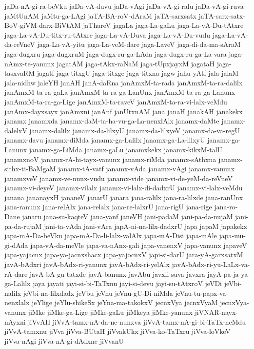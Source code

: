 {jaDa-nA-gi-ra-beVku
jaDa-vA-duvu
jaDa-vAgi
jaDa-vA-gi-ralu
jaDa-vA-gi-ruva
jaMtUnAM
jaMtu-ga-LAgi
jaTA-BA-roV-dAraM
jaTA-sarxsatx
jaTA-sarx-satx-BoV-giVM-darx-BiVtAM
jaThareV
jagaLa
jaga-La-gaLu
jaga-La-vA-Du-tAtxre
jaga-La-vA-Du-titx-ru-tAtxre
jaga-La-vA-Duva
jaga-La-vA-Du-vudu
jaga-La-vA-da-reVneV
jaga-La-vA-yitu
jaga-La-veM-dare
jaga-LaveV
jaga-di-da-ma-sAraM
jaga-dugxru
jaga-dugxruM
jaga-dugx-ru-ga-LAda
jaga-dugx-ru-ga-La-vara
jaga-nAmx-te-yanunx
jagatAM
jaga-tAkx-raNaM
jaga-tUpxjayxM
jagataH
jaga-tasxvaRM
jagatf
jaga-titxgU
jaga-titxge
jaga-titxna
jagw
jahu-yAtf
jala
jalaM
jala-nidhw
jaleYH
janAH
janA-daRna
janAmxM-ta-rada
janAmxM-ta-ra-dalilx
janAmxM-ta-ra-gaLa
janAmxM-ta-ra-ga-LanUnx
janAmxM-ta-ra-ga-Lanunx
janAmxM-ta-ra-ga-Lige
janAmxM-ta-raveV
janAmxM-ta-ra-vi-lalx-veMdu
janAmx-dayxsayx
janAmxni
janAnf
janUtxnAM
jana
janaH
janakAH
janakekx
janamx
janamxda
janamx-daM-ta-ha-vu-ga-La-nenxlAlx
janamx-daMte
janamx-dalelxV
janamx-dalilx
janamx-da-lilxyU
janamx-da-lilxyeV
janamx-da-va-regU
janamx-davu
janamx-diMda
janamx-ga-Lalilx
janamx-ga-La-lilxyU
janamx-ga-Lanunx
janamx-ga-LiMda
janamx-gaLu
janamxkekx
janamx-kikxM-talU
janamxnoV
janamx-rA-hi-tayx-vanunx
janamx-riMda
janamx-sAthxna
janamx-sithx-ti-BaMgaM
janamx-tA-vatf
janamx-vAda
janamx-vAgi
janamx-vanunx
janamxveV
janamx-ve-nunx-vudu
janamx-vide
janamx-vi-de-yeM-da-reVneV
janamx-vi-deyeV
janamx-vilalx
janamx-vi-lalx-di-dadxrU
janamx-vi-lalx-veMdu
janana
jananayxH
jananeV
janarU
janara
jana-ralilx
jana-ra-lilxde
jana-ranUnx
jana-ranunx
jana-relAlx
jana-relalx
jana-re-lalxrU
jana-rigU
jana-rige
jana-ro-Dane
janaru
jana-su-kaqteV
jana-yanf
janeVH
jani-padaM
jani-pa-da-nujaM
jani-pa-da-rujaM
jani-ta-vAda
jani-vAra
japA-ni-na-lilx-dadxrU
japa
japaM
japakekx
japa-mA-Da-beVku
japa-mA-Da-li-lalx-valAlx
japa-mA-Disi
japa-mAle
japa-mu-gi-dAda
japa-vA-da-meVle
japa-va-nAnx-gali
japa-vanenxV
japa-vanunx
japaveV
japa-yajacnx
japa-ya-jacnxshacx
japa-yajocnxV
japi-si-darU
jara-yA-garxsatxM
javA-bAdxri
javA-bAdx-ri-yanunx
javA-bAdx-ri-yelAlx
javA-bAdx-ri-yu-LaLx-va-rA-dare
javA-bA-gu-tatxde
javA-banunx
javAbu
javxli-suva
javxra
jayA-pa-ja-ya-ga-Lalilx
jaya
jayati
jayi-si-bi-TaTxnu
jayi-si-devu
jayi-su-tAtxroV
jeVDi
jeVbi-nalilx
jeVbi-na-lilxdadx
jeVbu
jeVnu
jeVnu-gU-Di-niMda
jeVnu-tu-papx-va-nenxlalx
jeYlige
jeYlu-shikeSx
jeYna-ma-takokxV
jecnxVya
jecnxVyaM
jecnxVya-vanunx
jiMke
jiMke-ga-Lige
jiMke-gaLu
jiMkeya
jiMke-yanunx
jiVNAR-nayx-nAyxni
jiVvAH
jiVvA-tamx-nA-da-ne-nunxva
jiVvA-tamx-nA-gi-bi-TaTx-neMdu
jiVvA-tamxnu
jiVva
jiVva-BUtaH
jiVvakUkx
jiVva-ko-TaTxru
jiVva-loVkeV
jiVva-nAgi
jiVva-nA-gi-dAdxne
jiVvanU
}
